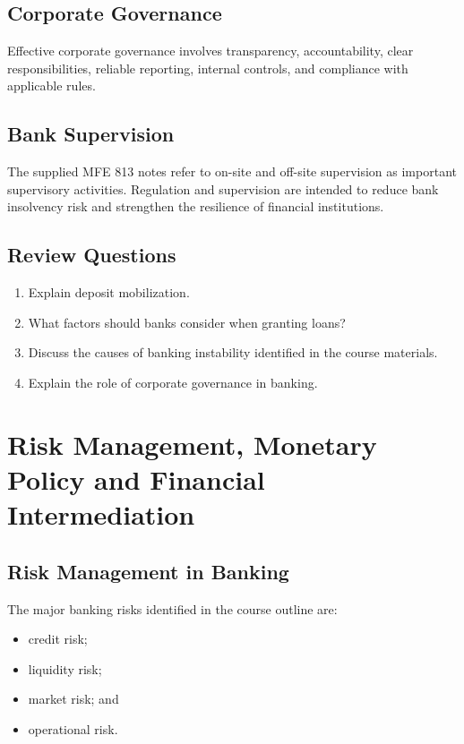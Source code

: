 \documentclass[
]{article}
\providecommand{\tightlist}{%
  \setlength{\itemsep}{0pt}\setlength{\parskip}{0pt}}
\begin{document}
\subsection{Corporate Governance}\label{corporate-governance}

Effective corporate governance involves transparency, accountability, clear responsibilities, reliable reporting, internal controls, and compliance with applicable rules.

\subsection{Bank Supervision}\label{bank-supervision}

The supplied MFE 813 notes refer to on-site and off-site supervision as important supervisory activities. Regulation and supervision are intended to reduce bank insolvency risk and strengthen the resilience of financial institutions.

\subsection{Review Questions}\label{review-questions-4}

\begin{enumerate}
\def\labelenumi{\arabic{enumi}.}
\tightlist
\item
  Explain deposit mobilization.
\item
  What factors should banks consider when granting loans?
\item
  Discuss the causes of banking instability identified in the course materials.
\item
  Explain the role of corporate governance in banking.
\end{enumerate}

\section{Risk Management, Monetary Policy and Financial Intermediation}\label{risk-management-monetary-policy-and-financial-intermediation}

\subsection{Risk Management in Banking}\label{risk-management-in-banking}

The major banking risks identified in the course outline are:

\begin{itemize}
\tightlist
\item
  credit risk;
\item
  liquidity risk;
\item
  market risk; and
\item
  operational risk.
\end{itemize}
\end{document}
